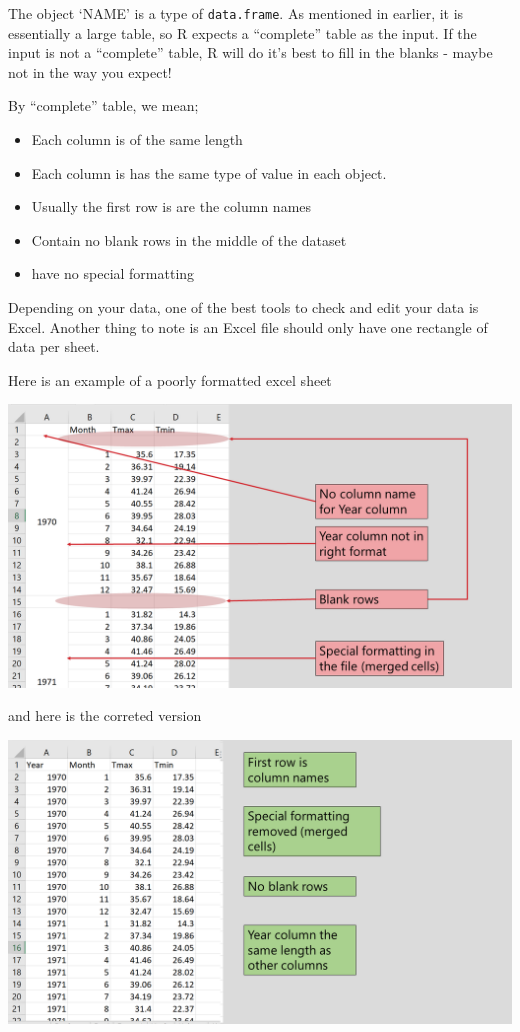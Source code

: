 \documentclass[]{book}
\providecommand{\tightlist}{%
  \setlength{\itemsep}{0pt}\setlength{\parskip}{0pt}}
\begin{document}
The object `NAME' is a type of \texttt{data.frame}. As mentioned in earlier, it is essentially a large table, so R expects a ``complete'' table as the input. If the input is not a ``complete'' table, R will do it's best to fill in the blanks - maybe not in the way you expect!

By ``complete'' table, we mean;

\begin{itemize}
\tightlist
\item
  Each column is of the same length
\item
  Each column is has the same type of value in each object.
\item
  Usually the first row is are the column names
\item
  Contain no blank rows in the middle of the dataset
\item
  have no special formatting
\end{itemize}

Depending on your data, one of the best tools to check and edit your data is Excel. Another thing to note is an Excel file should only have one rectangle of data per sheet.

Here is an example of a poorly formatted excel sheet

\includegraphics[width=\textwidth,height=\textheight]{Images/import1}

and here is the correted version

\includegraphics[width=\textwidth,height=\textheight]{Images/import2}
\end{document}
